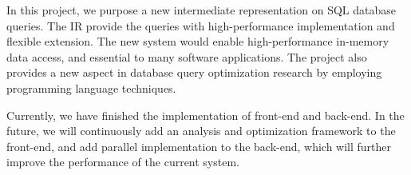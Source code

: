 \documentclass[sigplan]{acmart}
\begin{document}
In this project, we purpose a new intermediate representation on SQL database
queries. The IR provide the queries with high-performance implementation and
flexible extension. The new system would enable high-performance in-memory data
access, and essential to many software applications. The project also provides
a new aspect in database query optimization research by employing programming
language techniques. 

Currently, we have finished the implementation of front-end and back-end. In
the future, we will continuously add an analysis and optimization framework to
the front-end, and add parallel implementation to the back-end, which will
further improve the performance of the current system. 



\end{document}
